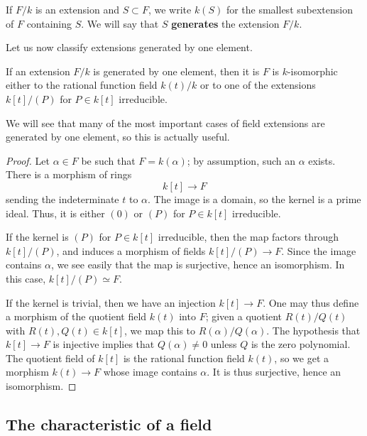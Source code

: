 \begin{definition} 
If $F/k$ is an extension and $S \subset F$, we write $k(S)$ for the smallest
subextension of $F$ containing $S$.
We will say that $S$ \textbf{generates} the extension $F/k$.
\end{definition} 

Let us now classify extensions generated by one element.
\begin{proposition} \label{fldmono} 
If an extension $F/k$ is generated by one element, then it is $F$ is $k$-isomorphic
either to the rational function field $k(t)/k$ or to one of the extensions
$k[t]/(P)$ for $P \in k[t]$ irreducible.
\end{proposition} 

We will see that many of the most important cases of field extensions are generated 
by one element, so this is actually useful. 

\begin{proof} 
Let $\alpha \in F$ be such that $F = k(\alpha)$; by assumption, such an
$\alpha$ exists. 
There is a morphism of rings
\[ k[t] \to F  \]
sending the indeterminate $t$ to $\alpha$. The image is a domain, so the
kernel is a prime ideal. Thus, it is either $(0)$ or $(P)$ for $P \in k[t]$
irreducible.

If the kernel is $(P)$ for $P \in k[t]$ irreducible, then the map factors
through $k[t]/(P)$, and induces a morphism of fields $k[t]/(P) \to F$. Since
the image contains $\alpha$, we see easily that the map is surjective, hence
an isomorphism. In this case, $k[t]/(P) \simeq F$.

If the kernel is trivial, then we have an injection 
$k[t] \to F$. 
One may thus define a morphism of the quotient field $k(t)$ into $F$; given a
quotient $R(t)/Q(t)$ with $R(t), Q(t) \in k[t]$, we map this to
$R(\alpha)/Q(\alpha)$. The hypothesis that $k[t] \to F$ is injective implies
that $Q(\alpha) \neq 0$ unless $Q$ is the zero polynomial. 
The quotient field of $k[t]$ is the rational function field $k(t)$, so we get a  morphism $k(t) \to F$
whose image contains $\alpha$. It is thus surjective, hence an isomorphism.
\end{proof}





\subsection{The characteristic of a field}
\label{more-fields}

